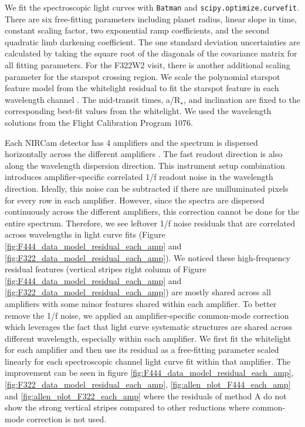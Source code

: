 \documentclass[sn-standardnature]{sn-jnl}%
\begin{document}
We fit the spectroscopic light curves with \texttt{Batman} and \texttt{scipy.optimize.curvefit}. There are six free-fitting parameters including planet radius, linear slope in time, constant scaling factor, two exponential ramp coefficients, and the second quadratic limb darkening coefficient. The one standard deviation uncertainties are calculated by taking the square root of the diagonals of the covariance matrix for all fitting parameters.  For the F322W2 visit, there is another additional scaling parameter for the starspot crossing region. We scale the polynomial starspot feature model from the whitelight residual to fit the starspot feature in each wavelength channel . The mid-transit times, a/R$_\star$, and inclination are fixed to the corresponding best-fit values from the whitelight. We used the wavelength solutions from the Flight Calibration Program 1076.

Each NIRCam detector has 4 amplifiers and the spectrum is dispersed horizontally across the different amplifiers . The fast readout direction is also along the wavelength dispersion direction. This instrument setup combination introduces amplifier-specific correlated 1/f readout noise in the wavelength direction. Ideally, this noise can be subtracted if there are unilluminated pixels for every row in each amplifier. However, since the spectra are dispersed continuously across the different amplifiers, this correction cannot be done for the entire spectrum. Therefore, we see leftover 1/f noise residuals that are correlated across wavelengths in light curve fits (Figure \ref{fig:F444_data_model_residual_each_amp} and \ref{fig:F322_data_model_residual_each_amp}). We noticed these high-frequency residual features (vertical stripes right column of Figure \ref{fig:F444_data_model_residual_each_amp} and \ref{fig:F322_data_model_residual_each_amp}) are mostly shared across all amplifiers with some minor features shared within each amplifier. To better remove the 1/f noise, we applied an amplifier-specific common-mode correction  which leverages the fact that light curve systematic structures are shared across different wavelength, especially within each amplifier. We first fit the whitelight for each amplifier and then use its residual as a free-fitting parameter scaled linearly for each spectroscopic channel light curve fit within that amplifier. The improvement can be seen in figure \ref{fig:F444_data_model_residual_each_amp}, \ref{fig:F322_data_model_residual_each_amp}, \ref{fig:allen_plot_F444_each_amp} and \ref{fig:allen_plot_F322_each_amp} where the residuals of method A do not show the strong vertical stripes compared to other reductions where common-mode correction is not used.
\end{document}
